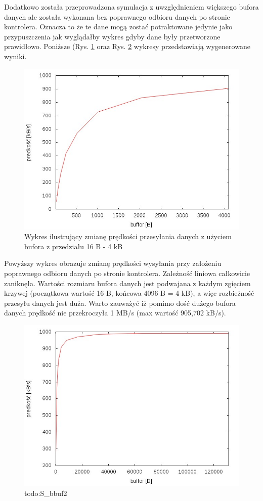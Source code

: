 \documentclass{BscUS}
\begin{document}
\noindent Dodatkowo została przeprowadzona symulacja z uwzględnieniem większego bufora danych ale została wykonana bez poprawnego odbioru danych po stronie kontrolera. Oznacza to że te dane mogą zostać potraktowane jedynie jako przypuszczenia jak wyglądałby wykres gdyby dane były przetworzone prawidłowo. Poniższe (Rys. \ref{fig:S_bbuf1} oraz Rys. \ref{fig:S_bbuf2} wykresy przedstawiają wygenerowane wyniki.

\begin{figure}[H]
{
\centering
\includegraphics[width=1\textwidth]{./img/S_bbuf1}
\caption{Wykres ilustrujący zmianę prędkości przesyłania danych z użyciem bufora z przedziału 16 B - 4 kB}
\label{fig:S_bbuf1}
}
\end{figure}
\noindent Powyższy wykres obrazuje zmianę prędkości wysyłania przy założeniu poprawnego odbioru danych po stronie kontrolera. Zależność liniowa całkowicie zaniknęła. Wartości rozmiaru bufora danych jest podwajana z każdym zgięciem krzywej (początkowa wartość 16 B, końcowa 4096 B = 4 kB), a więc rozbieżność przesyłu danych jest duża. Warto zauważyć iż pomimo dość dużego bufora danych prędkość nie przekroczyła 1 MB/s (max wartość 905,702 kB/s).
\begin{figure}[H]
{
\centering
\includegraphics[width=1\textwidth]{./img/S_bbuf2}
\caption{todo:S\_bbuf2}
\label{fig:S_bbuf2}
}
\end{figure}
\end{document}
